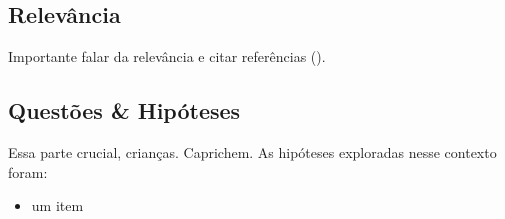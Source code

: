 \begin{refsection}
\subsection{Relevância}
Importante falar da relevância e citar referências (\cite{Nielsen2005,Sabeti2006}).

\subsection{\label{subsec:Perguntas}Questões \& Hipóteses}
Essa parte crucial, crianças. Caprichem.
As hipóteses exploradas nesse contexto foram: 
\begin{itemize}
\item um item
\end{itemize}


\renewcommand*{\bibfont}{\footnotesize}
\printbibliography[heading=bibintoc]

\end{refsection}




